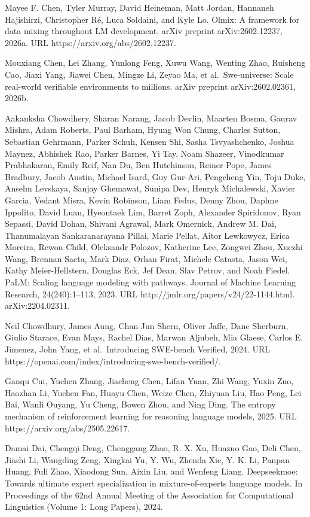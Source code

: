 \documentclass[
  10
]{article}
\begin{document}
Mayee F. Chen, Tyler Murray, David Heineman, Matt Jordan, Hannaneh
Hajishirzi, Christopher Ré, Luca Soldaini, and Kyle Lo. Olmix: A
framework for data mixing throughout LM development. arXiv preprint
arXiv:2602.12237, 2026a. URL https://arxiv.org/abs/2602.12237.

Mouxiang Chen, Lei Zhang, Yunlong Feng, Xuwu Wang, Wenting Zhao,
Ruisheng Cao, Jiaxi Yang, Jiawei Chen, Mingze Li, Zeyao Ma, et
al.~Swe-universe: Scale real-world verifiable environments to millions.
arXiv preprint arXiv:2602.02361, 2026b.

Aakanksha Chowdhery, Sharan Narang, Jacob Devlin, Maarten Bosma, Gaurav
Mishra, Adam Roberts, Paul Barham, Hyung Won Chung, Charles Sutton,
Sebastian Gehrmann, Parker Schuh, Kensen Shi, Sasha Tsvyashchenko,
Joshua Maynez, Abhishek Rao, Parker Barnes, Yi Tay, Noam Shazeer,
Vinodkumar Prabhakaran, Emily Reif, Nan Du, Ben Hutchinson, Reiner Pope,
James Bradbury, Jacob Austin, Michael Isard, Guy Gur-Ari, Pengcheng Yin,
Toju Duke, Anselm Levskaya, Sanjay Ghemawat, Sunipa Dev, Henryk
Michalewski, Xavier Garcia, Vedant Misra, Kevin Robinson, Liam Fedus,
Denny Zhou, Daphne Ippolito, David Luan, Hyeontaek Lim, Barret Zoph,
Alexander Spiridonov, Ryan Sepassi, David Dohan, Shivani Agrawal, Mark
Omernick, Andrew M. Dai, Thanumalayan Sankaranarayana Pillai, Marie
Pellat, Aitor Lewkowycz, Erica Moreira, Rewon Child, Oleksandr Polozov,
Katherine Lee, Zongwei Zhou, Xuezhi Wang, Brennan Saeta, Mark Diaz,
Orhan Firat, Michele Catasta, Jason Wei, Kathy Meier-Hellstern, Douglas
Eck, Jef Dean, Slav Petrov, and Noah Fiedel. PaLM: Scaling language
modeling with pathways. Journal of Machine Learning Research,
24(240):1--113, 2023. URL http://jmlr.org/papers/v24/22-1144.html.
arXiv:2204.02311.

Neil Chowdhury, James Aung, Chan Jun Shern, Oliver Jaffe, Dane Sherburn,
Giulio Starace, Evan Mays, Rachel Dias, Marwan Aljubeh, Mia Glaese,
Carlos E. Jimenez, John Yang, et al.~Introducing SWE-bench Verified,
2024. URL https://openai.com/index/introducing-swe-bench-verified/.

Ganqu Cui, Yuchen Zhang, Jiacheng Chen, Lifan Yuan, Zhi Wang, Yuxin Zuo,
Haozhan Li, Yuchen Fan, Huayu Chen, Weize Chen, Zhiyuan Liu, Hao Peng,
Lei Bai, Wanli Ouyang, Yu Cheng, Bowen Zhou, and Ning Ding. The entropy
mechanism of reinforcement learning for reasoning language models, 2025.
URL https://arxiv.org/abs/2505.22617.

Damai Dai, Chengqi Deng, Chenggang Zhao, R. X. Xu, Huazuo Gao, Deli
Chen, Jiashi Li, Wangding Zeng, Xingkai Yu, Y. Wu, Zhenda Xie, Y. K. Li,
Panpan Huang, Fuli Zhao, Xiaodong Sun, Aixin Liu, and Wenfeng Liang.
Deepseekmoe: Towards ultimate expert specialization in
mixture-of-experts language models. In Proceedings of the 62nd Annual
Meeting of the Association for Computational Linguistics (Volume 1: Long
Papers), 2024.
\end{document}
